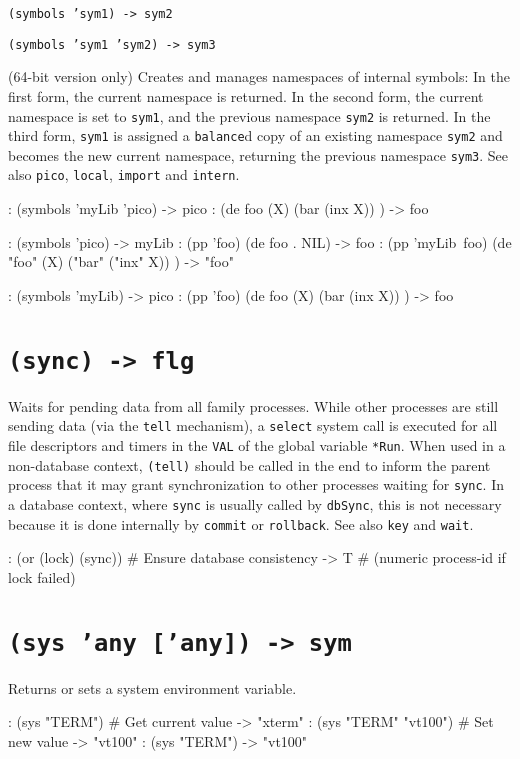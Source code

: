 \texttt{(symbols 'sym1) -> sym2}

\texttt{(symbols 'sym1 'sym2) -> sym3}

(64-bit version only) Creates and manages namespaces of internal
symbols: In the first form, the current namespace is returned. In the
second form, the current namespace is set to \texttt{sym1}, and the previous
namespace \texttt{sym2} is returned. In the third form, \texttt{sym1} is assigned a
\texttt{balance}d copy of an existing namespace \texttt{sym2} and becomes the new
current namespace, returning the previous namespace \texttt{sym3}. See also
\texttt{pico}, \texttt{local}, \texttt{import} and \texttt{intern}.


\begin{wideverbatim}
: (symbols 'myLib 'pico)
-> pico
: (de foo (X)
   (bar (inx X)) )
-> foo

: (symbols 'pico)
-> myLib
: (pp 'foo)
(de foo . NIL)
-> foo
: (pp 'myLib~foo)
(de "foo" (X)
   ("bar" ("inx" X)) )
-> "foo"

: (symbols 'myLib)
-> pico
: (pp 'foo)
(de foo (X)
   (bar (inx X)) )
-> foo
\end{wideverbatim}

 
\section*{\texttt{(sync) -> flg}}
\label{sec:func-ref-S-(sync) -> flg}


Waits for pending data from all family processes. While other processes
are still sending data (via the \texttt{tell} mechanism), a \texttt{select} system
call is executed for all file descriptors and timers in the \texttt{VAL} of the
global variable \texttt{*Run}. When used in a non-database context, \texttt{(tell)}
should be called in the end to inform the parent process that it may
grant synchronization to other processes waiting for \texttt{sync}. In a
database context, where \texttt{sync} is usually called by \texttt{dbSync}, this is
not necessary because it is done internally by \texttt{commit} or \texttt{rollback}.
See also \texttt{key} and \texttt{wait}.


\begin{wideverbatim}
: (or (lock) (sync))       # Ensure database consistency
-> T                       # (numeric process-id if lock failed)
\end{wideverbatim}

 
\section*{\texttt{(sys 'any ['any]) -> sym}}
\label{sec:func-ref-S-(sys 'any ['any]) -> sym}


Returns or sets a system environment variable.


\begin{wideverbatim}
: (sys "TERM")  # Get current value
-> "xterm"
: (sys "TERM" "vt100")  # Set new value
-> "vt100"
: (sys "TERM")
-> "vt100"
\end{wideverbatim}




% 
